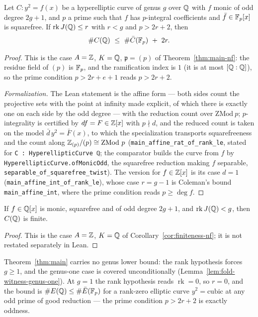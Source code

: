 \begin{theorem}
\label{thm:main}
\leanok
Let $C \colon y^2 = f(x)$ be a hyperelliptic curve of genus $g$ over $\mathbb{Q}$ with $f$ monic of
odd degree $2g+1$, and $p$ a prime such that $f$ has $p$-integral coefficients and
$\bar f \in \mathbb{F}_p[x]$ is squarefree. If $\operatorname{rk} J(\mathbb{Q}) \le r$ with $r < g$ and
$p > 2r + 2$, then
\[ \#C(\QQ)\ \le\ \#\bar C(\Fp)\ +\ 2r. \]
\end{theorem}
\begin{proof}
\leanok
This is the case $A = \mathbb{Z}$, $K = \mathbb{Q}$, $\mathfrak p = (p)$ of
Theorem~\ref{thm:main-nf}: the residue field of $(p)$ is $\mathbb{F}_p$, and the ramification
index is $1$ (it is at most $[\mathbb{Q}:\mathbb{Q}]$), so the prime condition $p > 2r + e + 1$ reads
$p > 2r + 2$.

\emph{Formalization.} The Lean statement is the affine form --- both sides count the
projective sets with the point at infinity made explicit, of which there is exactly one
on each side by the odd degree --- with the reduction count over $\mathrm{ZMod}\ p$;
$p$-integrality is certified by $d f = F \in \mathbb{Z}[x]$ with $p \nmid d$, and the reduced
count is taken on the model $\bar d\, y^2 = \bar F(x)$, to which the specialization
transports squarefreeness and the count along $\ZZ_{(p)}/(p) \cong \mathrm{ZMod}\ p$
(\texttt{main\_affine\_rat\_of\_rank\_le}, stated for \texttt{C : HyperellipticCurve ℚ}; the
comparator builds the curve from $f$ by \texttt{HyperellipticCurve.ofMonicOdd}, the squarefree
reduction making $f$ separable, \texttt{separable\_of\_squarefree\_twist}). The version for
$f \in \mathbb{Z}[x]$ is its case $d = 1$ (\texttt{main\_affine\_int\_of\_rank\_le}), whose case $r = g - 1$ is Coleman's
bound \texttt{main\_affine\_int}, where the prime condition reads $p \ge \deg f$.
\end{proof}

\begin{corollary}[Finiteness]
\label{cor:finiteness}
\leanok
If $f \in \mathbb{Q}[x]$ is monic, squarefree and of odd degree $2g+1$, and
$\operatorname{rk} J(\mathbb{Q}) < g$, then $C(\mathbb{Q})$ is finite.
\end{corollary}
\begin{proof}
\leanok
This is the case $A = \mathbb{Z}$, $K = \mathbb{Q}$ of Corollary~\ref{cor:finiteness-nf}; it is not
restated separately in Lean.
\end{proof}

\begin{remark}
\label{rem:genus-one}
Theorem~\ref{thm:main} carries no genus lower bound: the rank hypothesis forces
$g \ge 1$, and the genus-one case is covered unconditionally
(Lemma~\ref{lem:fold-witness-genus-one}). At $g = 1$ the rank hypothesis reads
$\operatorname{rk} = 0$, so $r = 0$, and the bound is $\#E(\mathbb{Q}) \le \#\bar E(\mathbb{F}_p)$ for a
rank-zero elliptic curve $y^2 = \text{cubic}$ at any odd prime of good reduction --- the
prime condition $p > 2r + 2$ is exactly oddness.
\end{remark}

